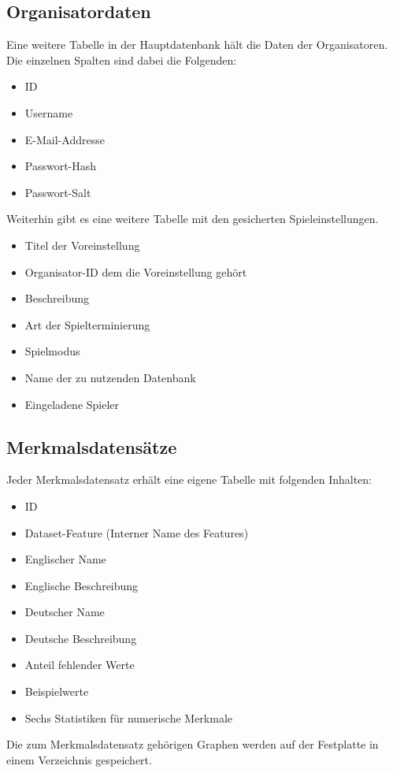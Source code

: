 \documentclass[a4paper]{scrreprt}
\begin{document}
	\subsection{Organisatordaten}
	Eine weitere Tabelle in der Hauptdatenbank hält die Daten der Organisatoren.
	Die einzelnen Spalten sind dabei die Folgenden:
	\begin{itemize}
		\item ID
		\item Username
		\item E-Mail-Addresse
		\item Passwort-Hash
		\item Passwort-Salt
	\end{itemize}
	Weiterhin gibt es eine weitere Tabelle mit den gesicherten Spieleinstellungen.
	\begin{itemize}
		\item Titel der Voreinstellung
		\item Organisator-ID dem die Voreinstellung gehört
		\item Beschreibung
		\item Art der Spielterminierung
		\item Spielmodus
		\item Name der zu nutzenden Datenbank
		\item Eingeladene Spieler
	\end{itemize}
	\subsection{Merkmalsdatensätze}
	Jeder Merkmalsdatensatz erhält eine eigene Tabelle mit folgenden Inhalten:
	\begin{itemize}
		\item ID
		\item Dataset-Feature (Interner Name des Features)
		\item Englischer Name
		\item Englische Beschreibung
		\item Deutscher Name
		\item Deutsche Beschreibung
		\item Anteil fehlender Werte
		\item Beispielwerte
		\item Sechs Statistiken für numerische Merkmale
	\end{itemize}
	Die zum Merkmalsdatensatz gehörigen Graphen werden auf der Festplatte in einem Verzeichnis gespeichert.
\end{document}
